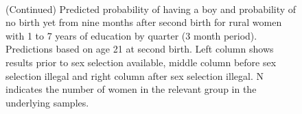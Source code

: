 \documentclass[12pt,letterpaper]{article}
\begin{document}
\begin{figure}[htpb]
{\begin{minipage}{0.31\textwidth}
        \captionsetup[subfigure]{labelformat=empty,position=top,captionskip=-1pt,farskip=-0.5pt}
        \\
        \captionsetup[subfigure]{labelformat=parens}
    \end{minipage}
}
\setcounter{subfigure}{6}
\caption{(Continued) Predicted probability of having a boy and probability of
no birth yet from nine months after second birth for rural
women with 1 to 7 years of education by quarter (3 month period). 
Predictions based on age 21 at second birth.
Left column shows results prior to sex selection available, middle column before
sex selection illegal and right column after sex selection illegal.
N indicates the number of women in the relevant group in the underlying samples.
}
\end{figure}


\end{document}
